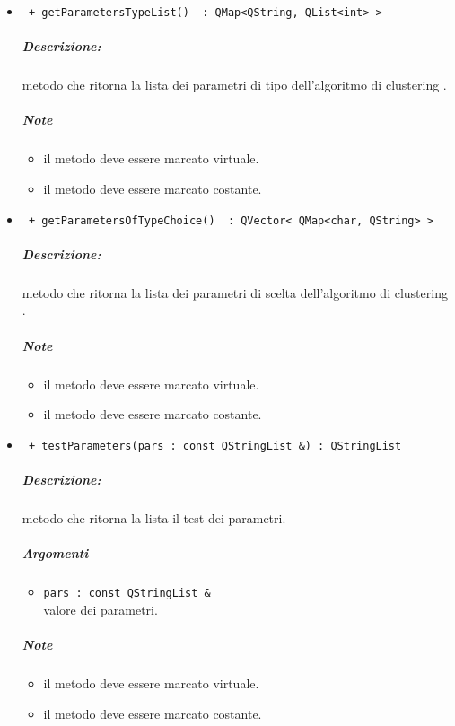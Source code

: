 \begin{itemize}
	\item \color{blue}\verb! + getParametersTypeList()  : QMap<QString, QList<int> >!
		\color{black}
		\subparagraph{Descrizione:} metodo che ritorna la lista dei parametri di tipo dell'algoritmo di clustering\g{} .
		\subparagraph{Note}
			\begin{itemize}
				\item il metodo deve essere marcato virtuale.
				\item il metodo deve essere marcato costante.
			\end{itemize}	
			
	\item \color{blue}\verb! + getParametersOfTypeChoice()  : QVector< QMap<char, QString> >!
		\color{black}
		\subparagraph{Descrizione:} metodo che ritorna la lista dei parametri di scelta dell'algoritmo di clustering\g{} .
		\subparagraph{Note}
			\begin{itemize}
				\item il metodo deve essere marcato virtuale.
				\item il metodo deve essere marcato costante.
			\end{itemize}	
	
		\item \color{blue}\verb! + testParameters(pars : const QStringList &) : QStringList!
		\color{black}
		\subparagraph{Descrizione:} metodo che ritorna la lista il test dei parametri.
		\subparagraph{Argomenti}
			\begin{itemize}
				\item \color{RoyalPurple} \verb!pars : const QStringList & ! \\ 
				\color{black} valore dei parametri.	
			\end{itemize}
		\subparagraph{Note}
			\begin{itemize}
				\item il metodo deve essere marcato virtuale.
				\item il metodo deve essere marcato costante.
			\end{itemize}				
			
	\end{itemize}
